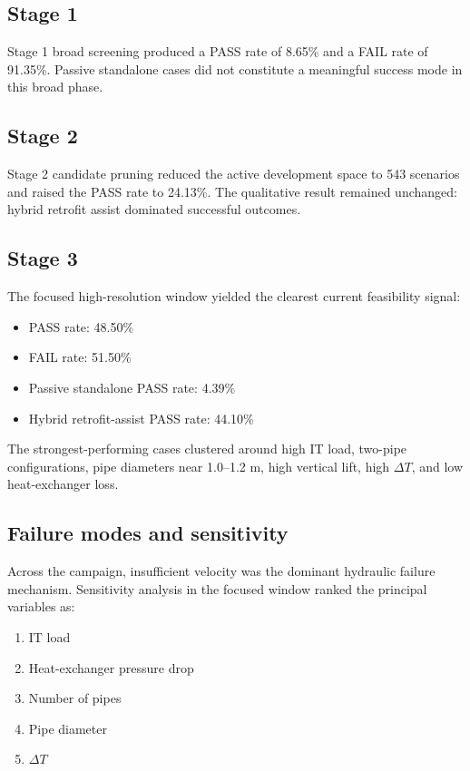 \documentclass[11pt]{article}
\begin{document}
\subsection{Stage 1}

Stage 1 broad screening produced a PASS rate of 8.65\% and a FAIL rate of 91.35\%. Passive standalone cases did not constitute a meaningful success mode in this broad phase.

\subsection{Stage 2}

Stage 2 candidate pruning reduced the active development space to 543 scenarios and raised the PASS rate to 24.13\%. The qualitative result remained unchanged: hybrid retrofit assist dominated successful outcomes.

\subsection{Stage 3}

The focused high-resolution window yielded the clearest current feasibility signal:

\begin{itemize}
  \item PASS rate: 48.50\%
  \item FAIL rate: 51.50\%
  \item Passive standalone PASS rate: 4.39\%
  \item Hybrid retrofit-assist PASS rate: 44.10\%
\end{itemize}

The strongest-performing cases clustered around high IT load, two-pipe configurations, pipe diameters near 1.0--1.2 m, high vertical lift, high $\Delta T$, and low heat-exchanger loss.

\subsection{Failure modes and sensitivity}

Across the campaign, insufficient velocity was the dominant hydraulic failure mechanism. Sensitivity analysis in the focused window ranked the principal variables as:

\begin{enumerate}[label=\arabic*)]
  \item IT load
  \item Heat-exchanger pressure drop
  \item Number of pipes
  \item Pipe diameter
  \item $\Delta T$
\end{enumerate}
\end{document}
